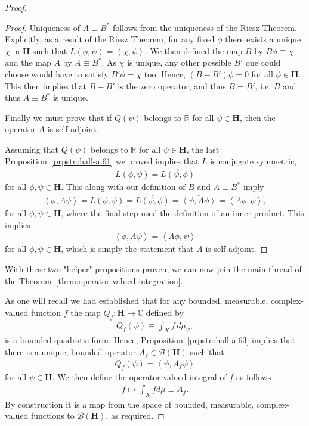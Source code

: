 \begin{proof}
\begin{proof}
Uniqueness of $A \equiv B^*$ follows from the uniqueness of the Riesz Theorem. Explicitly, as a result of the Riesz Theorem, for any fixed $\phi$ there exists a unique $\chi$ in $\mathbf{H}$ such that $L(\phi, \psi) = \left< \chi, \psi \right>$. We then defined the map $B$ by $B\phi \equiv \chi$ and the map $A$ by $A \equiv B^*$. As $\chi$ is unique, any other possible $B'$ one could choose would have to satisfy $B'\phi = \chi$ too. Hence, $(B - B')\phi = 0$ for all $\phi \in \mathbf{H}$. This then implies that $B - B'$ is the zero operator, and thus $B = B'$, i.e. $B$ and thus $A \equiv B^*$ is unique.

Finally we must prove that if $Q(\psi)$ belongs to $\mathbb{R}$ for all $\psi \in \mathbf{H}$, then the operator $A$ is self-adjoint.

Assuming that $Q(\psi)$ belongs to $\mathbb{R}$ for all $\psi \in \mathbf{H}$, the last Proposition~\ref{prpstn:hall-a.61} we proved implies that $L$ is conjugate symmetric,
\begin{align}
    L(\phi, \psi) = \overline{L(\psi, \phi)}
\end{align}
for all $\phi, \psi \in \mathbf{H}$. This along with our definition of $B$ and $A \equiv B^*$ imply
\begin{align}
    \left< \phi, A\psi \right> = L(\phi, \psi) = \overline{L(\psi, \phi)} = \overline{\left< \psi, A\phi \right>} = \left< A\phi, \psi \right>,
\end{align}
for all $\phi, \psi \in \mathbf{H}$, where the final step used the definition of an inner product. This implies
\begin{align}
    \left< \phi, A\psi \right> = \left< A\phi, \psi \right>
\end{align}
for all $\phi, \psi \in \mathbf{H}$, which is simply the statement that $A$ is self-adjoint.
\end{proof}

With these two "helper" propositions proven, we can now join the main thread of the Theorem~\ref{thrm:operator-valued-integration}.

As one will recall we had established that for any bounded, measurable, complex-valued function $f$ the map $Q_f : \mathbf{H} \rightarrow \mathbb{C}$ defined by
\begin{align}
    Q_f(\psi) \equiv \int_X f \, d\mu_\psi,
\end{align}
is a bounded quadratic form. Hence, Proposition~\ref{prpstn:hall-a.63} implies that there is a unique, bounded operator $A_f \in \mathcal{B}(\mathbf{H})$ such that
\begin{align}
    Q_f(\psi) = \left< \psi, A_f\psi \right>
\end{align}
for all $\psi \in \mathbf{H}$. We then define the operator-valued integral of $f$ as follows
\begin{align}
    f \longmapsto \int_X f d\mu \equiv A_f.
\end{align}
By construction it is a map from the space of bounded, measurable, complex-valued functions to $\mathcal{B}(\mathbf{H})$, as required.


\end{proof}
